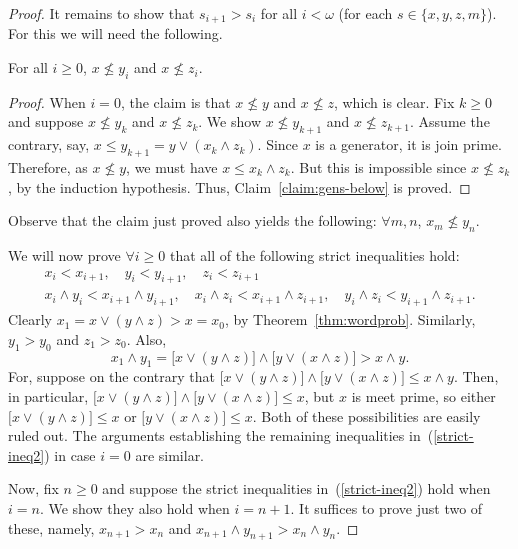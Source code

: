 \begin{proof}
It remains to show that $s_{i+1} > s_i$ for all $i<\omega$ (for each $s \in \{x, y, z, m\}$).  
For this we will need the following.

\begin{claim}\label{claim:gens-below} For all $i \geq 0$, $x\nleq y_i$ and $x \nleq z_i$.
\end{claim}
\begin{proof}
When $i=0$, the claim is that $x\nleq y$ and $x \nleq z$, which is clear.  
Fix $k\geq 0$ and suppose $x\nleq y_k$ and $x \nleq z_k$. We show 
$x\nleq y_{k+1}$ and $x \nleq z_{k+1}$.
Assume the contrary, say, $x\leq y_{k+1} = y \vee (x_k \wedge z_k)$.
Since $x$ is a generator, it is join prime. Therefore, as $x\nleq y$, we must have
$x \leq x_k \wedge z_k$. But this is impossible since 
$x \nleq z_k$, by the induction hypothesis. Thus, Claim~\ref{claim:gens-below} is proved.
\end{proof}
Observe that the claim just proved also yields the following: $\forall m, n$, $x_m \nleq y_n$. 

We will now prove $\forall i \geq 0$ that all of the following strict inequalities hold:
\begin{gather}
x_i < x_{i+1}, \quad y_i < y_{i+1}, \quad z_i < z_{i+1}\nonumber \\
x_i \wedge y_i < x_{i+1} \wedge  y_{i+1}, \quad 
x_i \wedge z_i < x_{i+1} \wedge  z_{i+1}, \quad 
y_i \wedge z_i < y_{i+1} \wedge  z_{i+1}.\label{strict-ineq2}
\end{gather}
Clearly $x_1 = x \vee (y \wedge z) > x = x_0$, by Theorem~\ref{thm:wordprob}. 
Similarly, $y_1 > y_0$ and $z_1 > z_0$.  
Also, 
\[
x_1 \wedge y_1 = \bigl[x \vee (y \wedge z)\bigr] \wedge \bigl[y \vee (x \wedge z)\bigr]
 > x \wedge y.\]
For, suppose on the contrary that 
$\bigl[x \vee (y \wedge z)\bigr] \wedge \bigl[y \vee (x \wedge z)\bigr]
\leq x \wedge y$. Then, in particular, 
$\bigl[x \vee (y \wedge z)\bigr] \wedge \bigl[y \vee (x \wedge z)\bigr]
\leq x$, but $x$ is meet prime, so 
either $\bigl[x \vee (y \wedge z)\bigr] \leq x$ or 
$\bigl[y \vee (x \wedge z)\bigr]\leq x$. Both of these possibilities are easily ruled out.
The arguments establishing the remaining inequalities in~(\ref{strict-ineq2}) 
in case $i=0$ are similar.

Now, fix $n\geq 0$ and suppose the strict
inequalities in~(\ref{strict-ineq2}) hold when $i=n$.
We show they also hold when $i = n+1$.  It suffices to prove just two of these, namely,
$x_{n+1} > x_n$ and $x_{n+1} \wedge y_{n+1} > x_n \wedge y_n$. 


\end{proof}
